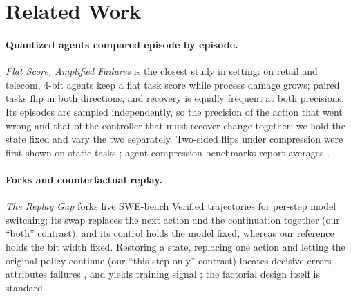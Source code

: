 \section{Related Work}
\label{sec:related}

\paragraph{Quantized agents compared episode by episode.} \emph{Flat Score, Amplified Failures} \citep{jang2026flat} is the closest study in setting: on \tautwo{} retail and telecom, 4-bit agents keep a flat task score while process damage grows; paired tasks flip in both directions, and recovery is equally frequent at both precisions. %
Its episodes are sampled independently, so the precision of the action that went wrong and that of the controller that must recover change together; we hold the state fixed and vary the two separately. Two-sided flips under compression were first shown on static tasks \citep{dutta2024accuracy}; agent-compression benchmarks report averages \citep{dong2025acbench}.

\paragraph{Forks and counterfactual replay.} \emph{The Replay Gap} \citep{gonuguntla2026replay} forks live SWE-bench Verified trajectories for per-step model switching; its swap replaces the next action and the continuation together (our ``both'' contrast), and its control holds the model fixed, whereas our reference holds the bit width fixed. %
Restoring a state, replacing one action and letting the original policy continue (our ``this step only'' contrast) locates decisive errors \citep{zhang2025agentracer}, attributes failures \citep{shah2026car}, and yields training signal \citep{li2026cso,li2026crr}; the factorial design itself is standard. %

